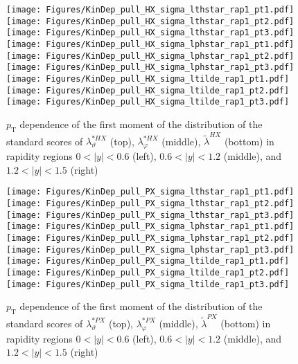 \documentclass[12pt]{article}
\newcommand{\pT}{p_\mathrm{T}}
\newcommand{\absy}{\left |  y \right |}
\newcommand{\lamtildeHX}{\tilde{\lambda}^{\scriptscriptstyle HX}}
\newcommand{\lamthstarHX}{\lambda^{* \scriptscriptstyle HX}_\vartheta}
\newcommand{\lamphstarHX}{\lambda^{* \scriptscriptstyle HX}_\varphi}
\newcommand{\lamtildePX}{\tilde{\lambda}^{\scriptscriptstyle PX}}
\newcommand{\lamthstarPX}{\lambda^{* \scriptscriptstyle PX}_\vartheta}
\newcommand{\lamphstarPX}{\lambda^{* \scriptscriptstyle PX}_\varphi}
\begin{document}
\begin{figure}[htbp]
\centering
\texttt{[image: Figures/KinDep\_pull\_HX\_sigma\_lthstar\_rap1\_pt1.pdf]}
\texttt{[image: Figures/KinDep\_pull\_HX\_sigma\_lthstar\_rap1\_pt2.pdf]}
\texttt{[image: Figures/KinDep\_pull\_HX\_sigma\_lthstar\_rap1\_pt3.pdf]}
\texttt{[image: Figures/KinDep\_pull\_HX\_sigma\_lphstar\_rap1\_pt1.pdf]}
\texttt{[image: Figures/KinDep\_pull\_HX\_sigma\_lphstar\_rap1\_pt2.pdf]}
\texttt{[image: Figures/KinDep\_pull\_HX\_sigma\_lphstar\_rap1\_pt3.pdf]}
\texttt{[image: Figures/KinDep\_pull\_HX\_sigma\_ltilde\_rap1\_pt1.pdf]}
\texttt{[image: Figures/KinDep\_pull\_HX\_sigma\_ltilde\_rap1\_pt2.pdf]}
\texttt{[image: Figures/KinDep\_pull\_HX\_sigma\_ltilde\_rap1\_pt3.pdf]}
\caption{$\pT$ dependence of the first moment of the distribution of the
standard scores of $\lamthstarHX$ (top), $\lamphstarHX$ (middle), $\lamtildeHX$ (bottom) in rapidity
regions $0<\absy<0.6$ (left), $0.6<\absy<1.2$ (middle), and $1.2<\absy<1.5$ (right)}
\end{figure}
\clearpage


\begin{figure}[htbp]
\centering
\texttt{[image: Figures/KinDep\_pull\_PX\_sigma\_lthstar\_rap1\_pt1.pdf]}
\texttt{[image: Figures/KinDep\_pull\_PX\_sigma\_lthstar\_rap1\_pt2.pdf]}
\texttt{[image: Figures/KinDep\_pull\_PX\_sigma\_lthstar\_rap1\_pt3.pdf]}
\texttt{[image: Figures/KinDep\_pull\_PX\_sigma\_lphstar\_rap1\_pt1.pdf]}
\texttt{[image: Figures/KinDep\_pull\_PX\_sigma\_lphstar\_rap1\_pt2.pdf]}
\texttt{[image: Figures/KinDep\_pull\_PX\_sigma\_lphstar\_rap1\_pt3.pdf]}
\texttt{[image: Figures/KinDep\_pull\_PX\_sigma\_ltilde\_rap1\_pt1.pdf]}
\texttt{[image: Figures/KinDep\_pull\_PX\_sigma\_ltilde\_rap1\_pt2.pdf]}
\texttt{[image: Figures/KinDep\_pull\_PX\_sigma\_ltilde\_rap1\_pt3.pdf]}
\caption{$\pT$ dependence of the first moment of the distribution of the
standard scores of $\lamthstarPX$ (top), $\lamphstarPX$ (middle), $\lamtildePX$ (bottom) in rapidity
regions $0<\absy<0.6$ (left), $0.6<\absy<1.2$ (middle), and $1.2<\absy<1.5$ (right)}
\end{figure}
\clearpage
\end{document}
